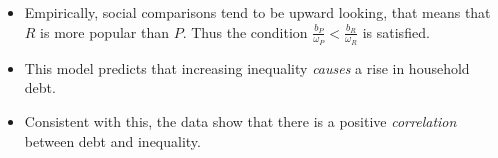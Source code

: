 \begin{parts}
\begin{solution}
\begin{itemize}
                \item Empirically, social comparisons tend to be upward looking, that means that $R$ is more popular than $P$. Thus the condition $\frac{b_P}{\omega_P} < \frac{b_R}{\omega_R}$ is satisfied.
    
                \item This model predicts that increasing inequality \emph{causes} a rise in household debt. 
                
                \item Consistent with this, the data show that there is a positive \emph{correlation} between debt and inequality.
            \end{itemize}
        \end{solution}
    \end{parts}